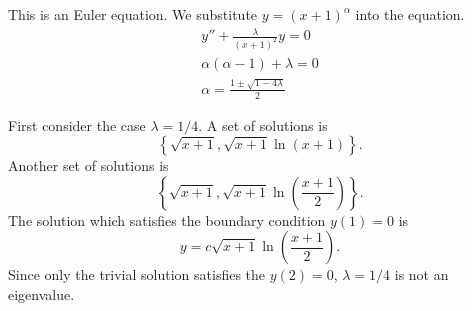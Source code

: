{%
\begin{Solution}
  \label{solution y''+lz12y=0}
  This is an Euler equation.  We substitute $y = (x + 1)^\alpha$ into the 
  equation.
  \begin{gather*}
    y'' + \frac{ \lambda }{ (x+1)^2 } y = 0 \\
    \alpha(\alpha-1) + \lambda = 0 \\
    \alpha = \frac{1 \pm \sqrt{1 - 4 \lambda}}{2}
  \end{gather*}



  First consider the case $\lambda = 1/4$.  A set of solutions is
  \[
  \left\{ \sqrt{x+1}, \sqrt{x+1} \ln(x+1) \right\}.
  \]
  Another set of solutions is
  \[
  \left\{ \sqrt{x+1}, \sqrt{x+1} \ln \left( \frac{x+1}{2} \right) \right\}.
  \]
  The solution which satisfies the boundary condition $y(1) = 0$ is
  \[
  y = c \sqrt{x+1} \ln \left( \frac{x+1}{2} \right).
  \]
  Since only the trivial solution satisfies the $y(2) = 0$, $\lambda = 1/4$
  is not an eigenvalue.





\end{Solution}}
